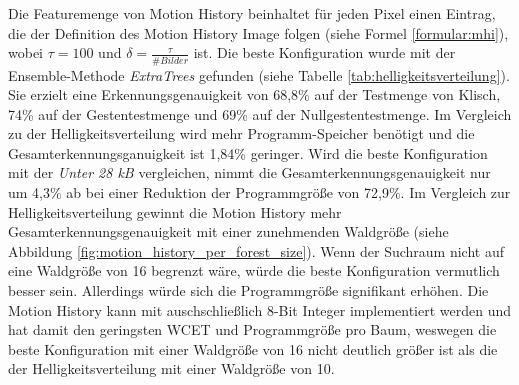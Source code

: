 Die Featuremenge von Motion History beinhaltet für jeden Pixel einen Eintrag, die der Definition des Motion History Image folgen (siehe Formel \ref{formular:mhi}), wobei $\tau=100$ und $\delta=\frac{\tau}{\#Bilder}$ ist.
\newline
\newline
Die beste Konfiguration wurde mit der Ensemble-Methode \textit{ExtraTrees} gefunden (siehe Tabelle \ref{tab:helligkeitsverteilung}). Sie erzielt eine Erkennungsgenauigkeit von 68,8\% auf der Testmenge von Klisch,
74\% auf der Gestentestmenge und 69\% auf der Nullgestentestmenge. Im Vergleich zu der Helligkeitsverteilung wird mehr Programm-Speicher benötigt und die Gesamterkennungsganuigkeit ist 1,84\% geringer.
\newline
\newline
Wird die beste Konfiguration mit der \textit{Unter 28 kB} vergleichen, nimmt die Gesamterkennungsgenauigkeit nur um 4,3\% ab bei einer Reduktion der Programmgröße von 72,9\%. Im Vergleich zur Helligkeitsverteilung
gewinnt die Motion History mehr Gesamterkennungsgenauigkeit mit einer zunehmenden Waldgröße (siehe Abbildung \ref{fig:motion_history_per_forest_size}). Wenn der Suchraum nicht auf eine Waldgröße von 16 begrenzt wäre,
würde die beste Konfiguration vermutlich besser sein. Allerdings würde sich die Programmgröße signifikant erhöhen.
\newline
\newline
Die Motion History kann mit auschschließlich 8-Bit Integer implementiert werden und hat damit den geringsten WCET und Programmgröße pro Baum, weswegen die beste Konfiguration mit einer Waldgröße von 16 nicht deutlich
größer ist als die der Helligkeitsverteilung mit einer Waldgröße von 10.
